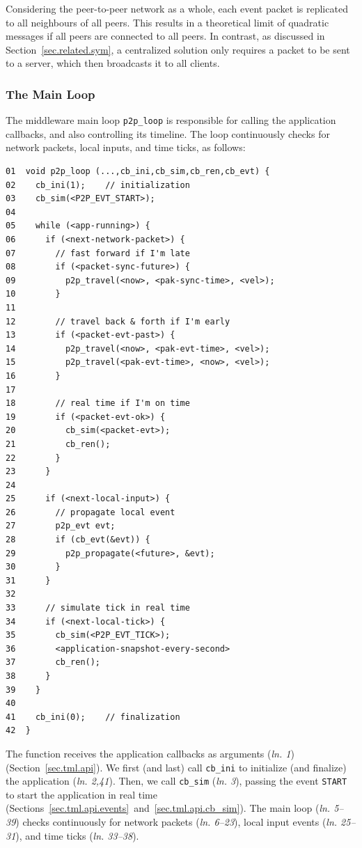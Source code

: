 \documentclass[fleqn,10pt]{SelfArx}
\newcommand{\code}[1]  {\texttt{\footnotesize{#1}}}
\newcommand{\lin}[1]{(\emph{ln. #1}\xspace)}
\begin{document}
Considering the peer-to-peer network as a whole, each event packet is
replicated to all neighbours of all peers.
This results in a theoretical limit of quadratic messages if all peers are
connected to all peers.
In contrast, as discussed in Section~\ref{sec.related.sym}, a centralized
solution only requires a packet to be sent to a server, which then broadcasts
it to all clients.

\subsubsection{The Main Loop}
\label{sec.tml.middleware.loop}

The middleware main loop \code{p2p\_loop} is responsible for calling the
application callbacks, and also controlling its timeline.
The loop continuously checks for network packets, local inputs, and time ticks,
as follows:

{\footnotesize
\begin{verbatim}
01  void p2p_loop (...,cb_ini,cb_sim,cb_ren,cb_evt) {
02    cb_ini(1);    // initialization
03    cb_sim(<P2P_EVT_START>);
04
05    while (<app-running>) {
06      if (<next-network-packet>) {
07        // fast forward if I'm late
08        if (<packet-sync-future>) {
09          p2p_travel(<now>, <pak-sync-time>, <vel>);
10        }
11
12        // travel back & forth if I'm early
13        if (<packet-evt-past>) {
14          p2p_travel(<now>, <pak-evt-time>, <vel>);
15          p2p_travel(<pak-evt-time>, <now>, <vel>);
16        }
17
18        // real time if I'm on time
19        if (<packet-evt-ok>) {
20          cb_sim(<packet-evt>);
21          cb_ren();
22        }
23      }
24
25      if (<next-local-input>) {
26        // propagate local event
27        p2p_evt evt;
28        if (cb_evt(&evt)) {
29          p2p_propagate(<future>, &evt);
30        }
31      }
32
33      // simulate tick in real time
34      if (<next-local-tick>) {
35        cb_sim(<P2P_EVT_TICK>);
36        <application-snapshot-every-second>
37        cb_ren();
38      }
39    }
40
41    cb_ini(0);    // finalization
42  }
\end{verbatim}
}

The function receives the application callbacks as arguments \lin{1}
(Section~\ref{sec.tml.api}).
We first (and last) call \code{cb\_ini} to initialize (and finalize) the
application \lin{2,41}.
Then, we call \code{cb\_sim} \lin{3}, passing the event \code{START} to start
the application in real time
(Sections~\ref{sec.tml.api.events}~and~\ref{sec.tml.api.cb_sim}).
The main loop \lin{5--39} checks continuously for network packets \lin{6--23},
local input events \lin{25--31}, and time ticks \lin{33--38}.
\end{document}

